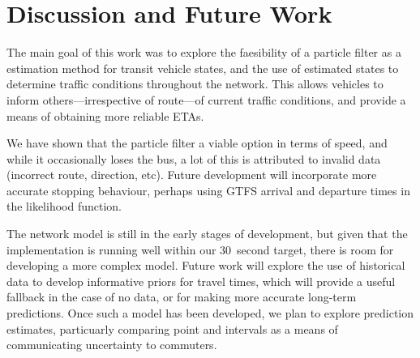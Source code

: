 \section{Discussion and Future Work}
\label{sec:discussion}

The main goal of this work was to explore the faesibility
of a particle filter as a \rt estimation method for transit vehicle states,
and the use of estimated states to determine traffic conditions
throughout the network.
This allows vehicles to inform others---irrespective of route---of 
current \rt traffic conditions,
and provide a means of obtaining more reliable ETAs.


We have shown that the particle filter a viable \rt option in terms of speed,
and while it occasionally loses the bus,
a lot of this is attributed to invalid data (incorrect route, direction, etc).
Future development will incorporate more accurate stopping behaviour,
perhaps using GTFS arrival and departure times in the likelihood function.


The network model is still in the early stages of development,
but given that the implementation is running well within our 30~second target,
there is room for developing a more complex model.
Future work will explore the use of historical data to develop informative priors
for travel times,
which will provide a useful fallback in the case of no data,
or for making more accurate long-term predictions.
Once such a model has been developed, we plan to explore prediction estimates,
particuarly comparing point and intervals as a means of communicating 
uncertainty to commuters.
